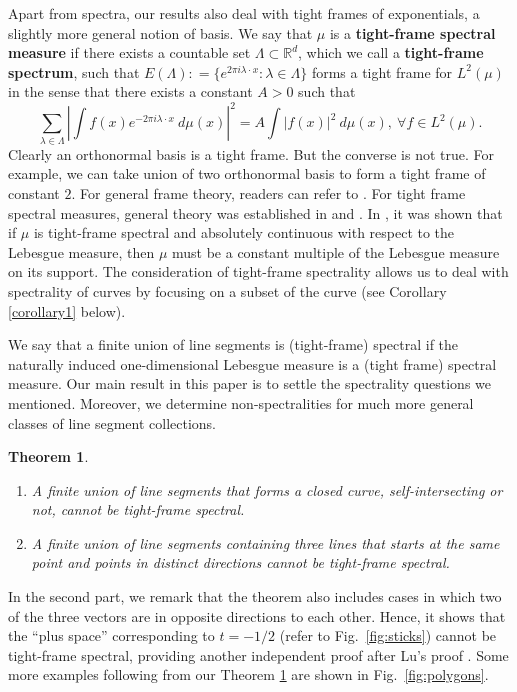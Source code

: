 \documentclass[12pt,a4paper,oneside]{amsart}
\newtheorem{theorem}{Theorem}
\theoremstyle{definition}
\newcommand{\RR}{{\mathbb R}}
\newcounter{rem}
\begin{document}
Apart from {spectra}, our results also deal with tight frames of exponentials, a slightly more general notion of basis.  We say that $\mu$ is a {\bf tight-frame spectral measure} if there exists a countable set $\Lambda\subset \RR^d$, which we call a {\bf tight-frame spectrum}, such that $E(\Lambda): = \{e^{2\pi i \lambda \cdot x}: \lambda\in\Lambda\}$ forms a tight frame for $L^2(\mu)$ in the sense that there exists a constant $A>0$ such that 
\begin{equation}\label{tight-frame}
\sum_{\lambda\in \Lambda} \left|\int f(x)e^{-2\pi i \lambda\cdot x}~d\mu(x)\right|^2  = A \int|f(x)|^2~d\mu(x), \ \forall f\in L^2(\mu). 
\end{equation}
Clearly an orthonormal basis is a tight frame. But the converse is not true. For example, we can take union of two orthonormal basis to form a tight frame of constant $2.$ For general frame theory, readers can refer to \cite{Heilbook}. For tight frame spectral measures, general theory was established in \cite{HLL2013} and \cite{dutkay2014uniformity}. In \cite{dutkay2014uniformity}, it was shown that if $\mu$ is tight-frame spectral and absolutely continuous with respect to the Lebesgue measure, then $\mu$ must be a constant multiple of the Lebesgue measure on its support. The consideration of tight-frame spectrality allows us to deal with spectrality of curves by focusing on a subset of {the curve} (see Corollary \ref{corollary1} below).

We say that a finite union of line segments is {(tight-frame)} spectral if the naturally induced one-dimensional Lebesgue measure is a  
{(tight frame)} spectral measure. Our main result in this paper is to settle the spectrality questions we mentioned. {Moreover, we determine non-spectralities for much more general classes of line segment collections.} 



\begin{theorem}\label{theorem1}
\begin{enumerate}
    \item A finite union of line segments that forms a closed curve{, self-intersecting or not,} cannot be  tight-frame spectral.
    \item A finite union of line segments containing three lines that starts at the same point and points in distinct directions cannot be tight-frame spectral.
\end{enumerate}
\end{theorem}

In the second part, we remark that the theorem also {includes cases in which} two of the three vectors are in opposite directions to each other. Hence, it shows that the ``plus space'' corresponding to $t = -1/2$  {(refer to Fig.\ \ref{fig:sticks})} cannot be tight-frame spectral, providing another independent proof after Lu's proof \cite{lu2025frameboundspectralgap}.  
Some more examples following from our Theorem \ref{theorem1} are shown in Fig.\ \ref{fig:polygons}.
\end{document}
